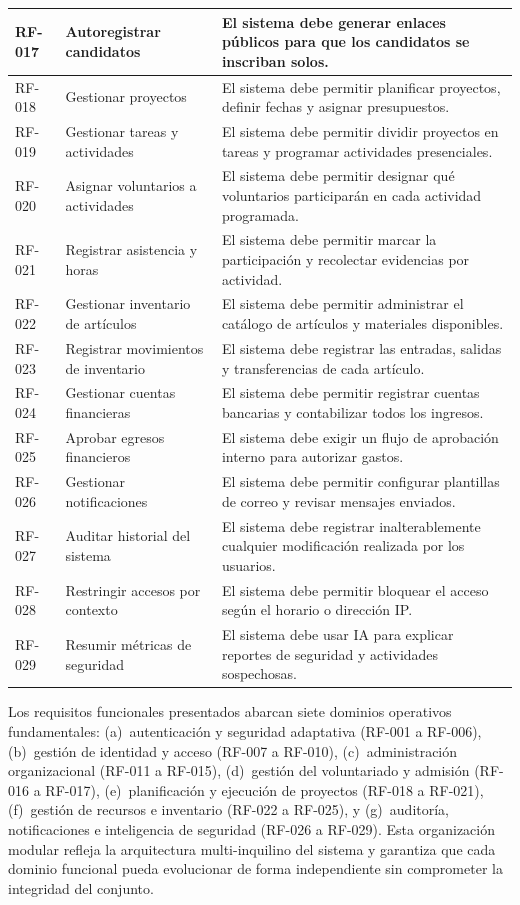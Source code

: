 \begin{small}
\begin{longtable}{|p{1.4cm}|p{3.8cm}|p{8.5cm}|}
\hline
RF-017 & Autoregistrar candidatos & El sistema debe generar enlaces p\'ublicos para que los candidatos se inscriban solos. \\
\hline
RF-018 & Gestionar proyectos & El sistema debe permitir planificar proyectos, definir fechas y asignar presupuestos. \\
\hline
RF-019 & Gestionar tareas y actividades & El sistema debe permitir dividir proyectos en tareas y programar actividades presenciales. \\
\hline
RF-020 & Asignar voluntarios a actividades & El sistema debe permitir designar qu\'e voluntarios participar\'an en cada actividad programada. \\
\hline
RF-021 & Registrar asistencia y horas & El sistema debe permitir marcar la participaci\'on y recolectar evidencias por actividad. \\
\hline
RF-022 & Gestionar inventario de art\'iculos & El sistema debe permitir administrar el cat\'alogo de art\'iculos y materiales disponibles. \\
\hline
RF-023 & Registrar movimientos de inventario & El sistema debe registrar las entradas, salidas y transferencias de cada art\'iculo. \\
\hline
RF-024 & Gestionar cuentas financieras & El sistema debe permitir registrar cuentas bancarias y contabilizar todos los ingresos. \\
\hline
RF-025 & Aprobar egresos financieros & El sistema debe exigir un flujo de aprobaci\'on interno para autorizar gastos. \\
\hline
RF-026 & Gestionar notificaciones & El sistema debe permitir configurar plantillas de correo y revisar mensajes enviados. \\
\hline
RF-027 & Auditar historial del sistema & El sistema debe registrar inalterablemente cualquier modificaci\'on realizada por los usuarios. \\
\hline
RF-028 & Restringir accesos por contexto & El sistema debe permitir bloquear el acceso seg\'un el horario o direcci\'on IP. \\
\hline
RF-029 & Resumir m\'etricas de seguridad & El sistema debe usar IA para explicar reportes de seguridad y actividades sospechosas. \\

\end{longtable}
\end{small}

Los requisitos funcionales presentados abarcan siete dominios operativos
fundamentales: (a)~autenticaci\'on y seguridad adaptativa (RF-001 a RF-006),
(b)~gesti\'on de identidad y acceso (RF-007 a RF-010), (c)~administraci\'on
organizacional (RF-011 a RF-015), (d)~gesti\'on del voluntariado y admisi\'on
(RF-016 a RF-017), (e)~planificaci\'on y ejecuci\'on de proyectos (RF-018 a RF-021),
(f)~gesti\'on de recursos e inventario (RF-022 a RF-025), y (g)~auditor\'ia,
notificaciones e inteligencia de seguridad (RF-026 a RF-029). Esta organizaci\'on
modular refleja la arquitectura multi-inquilino del sistema y garantiza que cada
dominio funcional pueda evolucionar de forma independiente sin comprometer la
integridad del conjunto.


